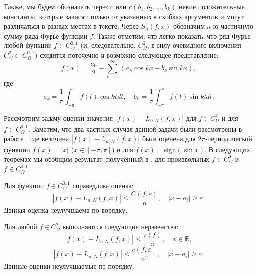 Также, мы будем обозначать через $c$ или $c(b_1, b_2, \ldots, b_k)$ некие положительные константы, которые зависят только от указанных в скобках аргументов и могут
различаться в разных местах в тексте.  Через $S_n(f,x)$ обозначим $n$-ю частичную сумму ряда Фурье функции $f$.
Также отметим, что легко показать, что ряд Фурье любой функции $f \in C_\Omega^{0,1}$ (и, следовательно, $C_\Omega^{2}$, в силу очевидного включения $C_\Omega^{2} \subset C_\Omega^{0,1}$)
сходится поточечно и возможно следующее представление:
\begin{equation}\label{f_as_Fourier}
	f(x) = \frac{a_0}{2} + \sum_{k=1}^{\infty} \left(a_k \cos kx + b_k \sin kx\right),
\end{equation}
где
\begin{equation}\label{akbk_definition}
	a_k = \frac1\pi \int_{-\pi}^{\pi} f(t) \cos kt dt,\quad b_k = \frac1\pi \int_{-\pi}^{\pi} f(t) \sin kt dt.
\end{equation}

Рассмотрим задачу оценки значения $\left|f(x)-L_{n,N}(f,x)\right|$ для $f\in C_{\Omega}^{2}$ и для $f\in C_{\Omega}^{0,1}$.
Заметим, что два частных случая данной задачи были рассмотрены в работе \cite{akniyev}, где величина $\left|f(x)-L_{n,N}(f,x)\right|$ была
оценена для $2\pi$-периодической функции $f(x) = |x|$ ($x \in [-\pi,\pi]$) и для $f(x) = \mbox{sign} (\sin x)$.
В следующих теоремах мы обобщим результат, полученный в \cite{akniyev}, для произвольных $f \in C_{\Omega}^{2}$ и $f \in C_{\Omega}^{0,1}$.
\begin{theorem}\label{theorem}
	Для функции $f \in C_{\Omega}^{0,1}$ справедлива оценка:
	\begin{equation}\label{theorem_result}
	\left| f(x) - L_{n,N}(f,x) \right| \leq \frac{C(f,\varepsilon)}{n}, \quad |x - a_i| \geq \varepsilon.
	\end{equation}
	Данная оценка неулучшаема по порядку.
\end{theorem}
\begin{theorem}
	\label{Th1} Для любой $f\in C_{\Omega}^{2}$ выполняются следующие неравенства:
	\begin{equation}\label{Th1:eq1}
	\left|f(x)-L_{n,N}(f,x)\right|\leq\frac{c(f)}{n},\quad x\in\mathbb{R},
	\end{equation}
	\begin{equation}\label{Th1:eq2}
	\left|f(x)-L_{n,N}(f,x)\right|\leq\frac{c(f,\varepsilon)}{n^{2}},\quad \left|x-a_{i}\right|\geq\varepsilon.
	\end{equation}
	Данные оценки неулучшаемые по порядку.
\end{theorem}

